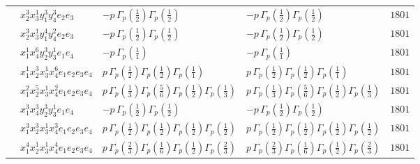 \documentclass[11pt]{article}
\begin{document}
\begin{table}[ht]
{\begin{tabular}{@{}lllll@{}}
 & $x_{2}^{3} x_{3}^{1} y_{1}^{3} y_{4}^{3} e_{2} e_{3}$ & $- p \, \Gamma_p \left( \frac{1}{2} \right) \Gamma_p \left( \frac{1}{2} \right)$ & $- p \, \Gamma_p \left( \frac{1}{2} \right) \Gamma_p \left( \frac{1}{2} \right)$ & $1801$ \\
 & $x_{2}^{3} x_{3}^{1} y_{1}^{4} y_{4}^{2} e_{2} e_{3}$ & $- p \, \Gamma_p \left( \frac{1}{2} \right) \Gamma_p \left( \frac{1}{2} \right)$ & $- p \, \Gamma_p \left( \frac{1}{2} \right) \Gamma_p \left( \frac{1}{2} \right)$ & $1801$ \\
 & $x_{1}^{1} x_{4}^{6} y_{2}^{3} y_{3}^{1} e_{1} e_{4}$ & $- p \, \Gamma_p \left( \frac{1}{1} \right)$ & $- p \, \Gamma_p \left( \frac{1}{1} \right)$ & $1801$ \\
 & $x_{1}^{1} x_{2}^{3} x_{3}^{1} x_{4}^{6}  e_{1} e_{2} e_{3} e_{4}$ & $p \, \Gamma_p \left( \frac{1}{2} \right) \Gamma_p \left( \frac{1}{2} \right) \Gamma_p \left( \frac{1}{1} \right)$ & $p \, \Gamma_p \left( \frac{1}{2} \right) \Gamma_p \left( \frac{1}{2} \right) \Gamma_p \left( \frac{1}{1} \right)$ & $1801$ \\
 & $x_{1}^{2} x_{2}^{5} x_{3}^{1} x_{4}^{2}  e_{1} e_{2} e_{3} e_{4}$ & $p \, \Gamma_p \left( \frac{1}{3} \right) \Gamma_p \left( \frac{5}{6} \right) \Gamma_p \left( \frac{1}{2} \right) \Gamma_p \left( \frac{1}{3} \right)$ & $p \, \Gamma_p \left( \frac{1}{3} \right) \Gamma_p \left( \frac{5}{6} \right) \Gamma_p \left( \frac{1}{2} \right) \Gamma_p \left( \frac{1}{3} \right)$ & $1801$ \\
 & $x_{1}^{3} x_{4}^{3} y_{2}^{3} y_{3}^{1} e_{1} e_{4}$ & $- p \, \Gamma_p \left( \frac{1}{2} \right) \Gamma_p \left( \frac{1}{2} \right)$ & $- p \, \Gamma_p \left( \frac{1}{2} \right) \Gamma_p \left( \frac{1}{2} \right)$ & $1801$ \\
 & $x_{1}^{3} x_{2}^{3} x_{3}^{1} x_{4}^{3}  e_{1} e_{2} e_{3} e_{4}$ & $p \, \Gamma_p \left( \frac{1}{2} \right) \Gamma_p \left( \frac{1}{2} \right) \Gamma_p \left( \frac{1}{2} \right) \Gamma_p \left( \frac{1}{2} \right)$ & $p \, \Gamma_p \left( \frac{1}{2} \right) \Gamma_p \left( \frac{1}{2} \right) \Gamma_p \left( \frac{1}{2} \right) \Gamma_p \left( \frac{1}{2} \right)$ & $1801$ \\
 & $x_{1}^{4} x_{2}^{1} x_{3}^{1} x_{4}^{4}  e_{1} e_{2} e_{3} e_{4}$ & $p \, \Gamma_p \left( \frac{2}{3} \right) \Gamma_p \left( \frac{1}{6} \right) \Gamma_p \left( \frac{1}{2} \right) \Gamma_p \left( \frac{2}{3} \right)$ & $p \, \Gamma_p \left( \frac{2}{3} \right) \Gamma_p \left( \frac{1}{6} \right) \Gamma_p \left( \frac{1}{2} \right) \Gamma_p \left( \frac{2}{3} \right)$ & $1801$ \\

\end{tabular}}
\end{table}
\end{document}
